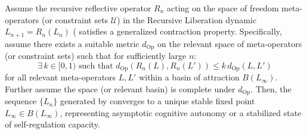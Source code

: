 \begin{proposition}
\label{prop:bk9_convergence_of_recursive_liberation}
Assume the recursive reflective operator $R_n$ acting on the space of freedom meta-operators (or constraint sets $\mathcal{U}$) in the Recursive Liberation dynamic $L_{n+1} = R_n(L_n)$ (%
satisfies a generalized contraction property. Specifically, assume there exists a suitable metric $d_{\text{Op}}$ on the relevant space of meta-operators (or constraint sets) such that for sufficiently large $n$:
\[
\exists \, k \in [0, 1) \text{ such that } d_{\text{Op}}(R_n(L), R_n(L')) \le k \, d_{\text{Op}}(L, L')
\]
for all relevant meta-operators $L, L'$ within a basin of attraction $B(L_\infty)$. Further assume the space (or relevant basin) is complete under $d_{\text{Op}}$. Then, the sequence $\{L_n\}$ generated by %
converges to a unique stable fixed point $L_\infty \in B(L_\infty)$, representing asymptotic cognitive autonomy or a stabilized state of self-regulation capacity.
\end{proposition}
